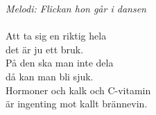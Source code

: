 {\footnotesize\textit{Melodi: Flickan hon går i dansen}}\\
\\
Att ta sig en riktig hela\\
det är ju ett bruk.\\
På den ska man inte dela\\
då kan man bli sjuk.\\
Hormoner och kalk och C-vitamin\\
är ingenting mot kallt brännevin.
